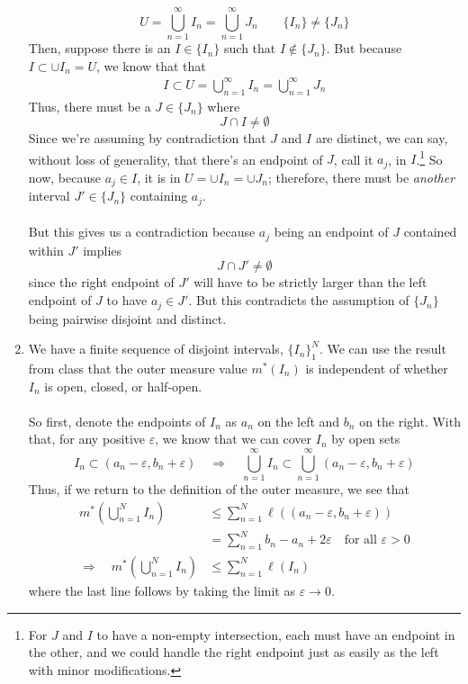 \documentclass[12pt]{article}
\theoremstyle{plain}
\theoremstyle{definition}
\theoremstyle{remark}
\begin{document}
\begin{enumerate}
\[
    U = \bigcup^\infty_{n=1} I_n = 
    \bigcup^\infty_{n=1} J_n \qquad \{I_n\} \neq \{J_n\}
\]
Then, suppose there is an $I \in \{I_n\}$ such that $I \not\in \{J_n\}$. But because $I \subset \cup I_n = U$, we know that that
\begin{align*}
    I \subset U = 
    \bigcup^\infty_{n=1} I_n
    = \bigcup^\infty_{n=1} J_n
\end{align*}
Thus, there must be a $J \in \{J_n\}$ where 
\[
    J \cap I \neq \emptyset
\]
Since we're assuming by contradiction that $J$ and $I$ are distinct, we can say, without loss of generality, that there's an endpoint of $J$, call it $a_j$, in $I$.\footnote{For $J$ and $I$ to have a non-empty intersection, each must have an endpoint in the other, and we could handle the right endpoint just as easily as the left with minor modifications.} So now, because $a_{j}\in I$, it is in $U = \cup I_n = \cup J_n $; therefore, there must be \emph{another} interval $J' \in \{J_n\}$ containing $a_{j}$. 
\\
\\
But this gives us a contradiction because $a_j$ being an endpoint of $J$ contained within $J'$ implies
\[
    J \cap J' \neq \emptyset
\]
since the right endpoint of $J'$ will have to be strictly larger than the left endpoint of $J$ to have $a_j \in J'$. But this contradicts the assumption of $\{J_n\}$ being pairwise disjoint and distinct.





\item We have a finite sequence of disjoint intervals, $\{I_n\}_1^N$. We can use the result from class that the outer measure value $m^*(I_n)$ is independent of whether $I_n$ is open, closed, or half-open.
\\
\\
So first, denote the endpoints of $I_n$ as $a_n$ on the left and $b_n$ on the right. With that, for any positive $\varepsilon$, we know that we can cover $I_n$ by open sets
\[
    I_n \subset (a_n-\varepsilon, b_n+\varepsilon)
    \quad \Rightarrow\quad
    \bigcup^\infty_{n=1} I_n \subset 
    \bigcup^\infty_{n=1}(a_n-\varepsilon, b_n+\varepsilon)
\]
Thus, if we return to the definition of the outer measure, we see that 
\begin{align*}
    m^*\left(\bigcup^N_{n=1} I_n\right) &\leq 
    \sum^N_{n=1} \ell\left((a_n-\varepsilon, b_n+\varepsilon)
    \right) \\
    &= \sum^N_{n=1} b_n - a_n + 2\varepsilon 
    \quad \text{for all $\varepsilon>0$}\\
    \Rightarrow\quad
    m^*\left(\bigcup^N_{n=1} I_n\right) &\leq 
    \sum^N_{n=1} \ell(I_n) 
\end{align*}
where the last line follows by taking the limit as $\varepsilon\rightarrow 0$.


\end{enumerate}
\end{document}
